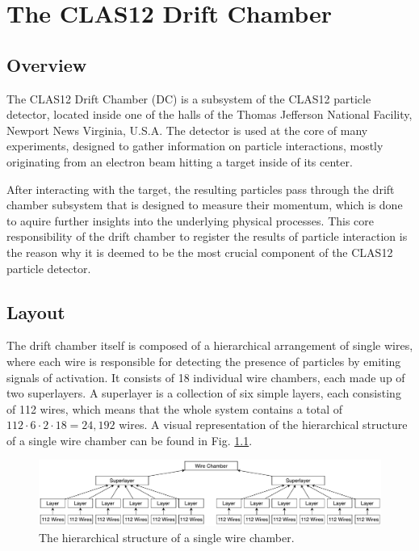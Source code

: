 \chapter{The CLAS12 Drift Chamber}

\section{Overview}

The CLAS12 Drift Chamber (DC) is a subsystem of the CLAS12 particle
detector, located inside one of the halls of the Thomas
Jefferson National Facility, Newport News Virginia, U.S.A. The
detector is used at the core of many experiments, designed to gather
information on particle interactions, mostly originating from an
electron beam hitting a target inside of its center.

After interacting with the target, the resulting particles pass
through the drift chamber subsystem that is designed to measure their
momentum, which is done to aquire further insights into the underlying
physical processes. This core responsibility of the drift chamber to
register the results of particle interaction is the reason why it is
deemed to be the most crucial component of the CLAS12 particle
detector.

\section{Layout}

The drift chamber itself is composed of a hierarchical arrangement of
single wires, where each wire is responsible for detecting the presence of
particles by emiting signals of activation. It consists of 18
individual wire chambers, each made up of two superlayers. A
superlayer is a collection of six simple layers, each consisting of
112 wires, which means that the whole system contains a total of
\(112 \cdot 6 \cdot 2 \cdot 18 = 24,192\) wires.
A visual representation of the hierarchical structure of a
single wire chamber can be found in Fig. \ref{fig:wire-chamber}.
\begin{figure}[h]
  \centering
  \includegraphics[width=\textwidth]{../figures/wire_chamber}
  \caption{The hierarchical structure of a single wire chamber.}
  \label{fig:wire-chamber}
\end{figure}

